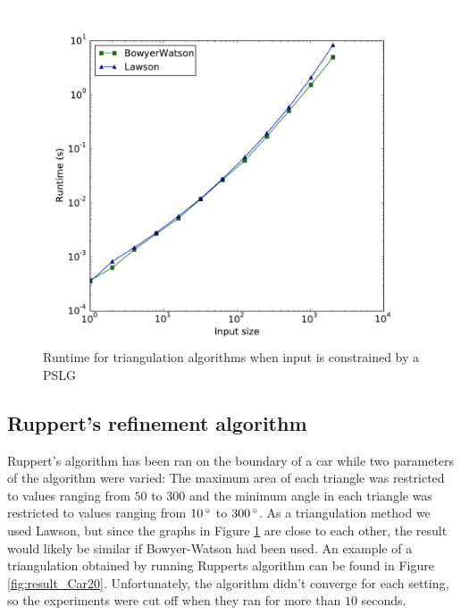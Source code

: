 \begin{figure}[ht]
    \centering
    \includegraphics[width=\columnwidth]{../images/runtime_segments.pdf}
    \caption{Runtime for triangulation algorithms when input is constrained by a PSLG}
    \label{fig:triangulation-pslg-runtime}
\end{figure}

\subsection{Ruppert's refinement algorithm}
\label{sub:results:ruppert}

Ruppert's algorithm has been ran on the boundary of a car while two parameters of the algorithm were varied:
The maximum area of each triangle was restricted to values ranging from $50$ to $300$ and
the minimum angle in each triangle was restricted to values ranging from $10\,^{\circ}$ to $300\,^{\circ}$.
As a triangulation method we used Lawson, but since the graphs in Figure \ref{fig:triangulation-pslg-runtime} are close to each other, the result would likely be similar if Bowyer-Watson had been used.
An example of a triangulation obtained by running Rupperts algorithm can be found in Figure \ref{fig:result_Car20}.
Unfortunately, the algorithm didn't converge for each setting, so the experiments were cut off when they ran for more than $10$ seconds.


